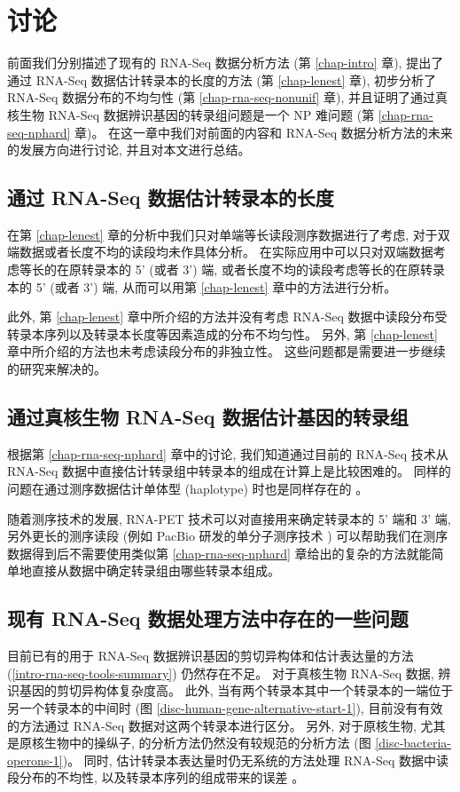 \chapter{讨论}
前面我们分别描述了现有的 RNA-Seq 数据分析方法 (第 \ref{chap-intro} 章), 
提出了通过 RNA-Seq 数据估计转录本的长度的方法 (第 \ref{chap-lenest} 章),  
初步分析了 RNA-Seq 数据分布的不均匀性 (第 \ref{chap-rna-seq-nonunif} 章),  
并且证明了通过真核生物 RNA-Seq 数据辨识基因的转录组问题是一个 NP 难问题 (第 \ref{chap-rna-seq-nphard} 章)。   
在这一章中我们对前面的内容和 RNA-Seq 数据分析方法的未来的发展方向进行讨论, 
并且对本文进行总结。 

\section{通过 RNA-Seq 数据估计转录本的长度}
在第 \ref{chap-lenest} 章的分析中我们只对单端等长读段测序数据进行了考虑, 
对于双端数据或者长度不均的读段均未作具体分析。 
在实际应用中可以只对双端数据考虑等长的在原转录本的 5' (或者 3') 端, 
或者长度不均的读段考虑等长的在原转录本的 5' (或者 3') 端, 
从而可以用第 \ref{chap-lenest} 章中的方法进行分析。 

此外, 第 \ref{chap-lenest} 章中所介绍的方法并没有考虑 RNA-Seq 
数据中读段分布受转录本序列以及转录本长度等因素造成的分布不均匀性。 
另外, 第 \ref{chap-lenest} 章中所介绍的方法也未考虑读段分布的非独立性。 
这些问题都是需要进一步继续的研究来解决的。 

\section{通过真核生物 RNA-Seq 数据估计基因的转录组}
根据第 \ref{chap-rna-seq-nphard} 章中的讨论, 
我们知道通过目前的 RNA-Seq 技术从 RNA-Seq 数据中直接估计转录组中转录本的组成在计算上是比较困难的。 
同样的问题在通过测序数据估计单体型 (haplotype) 
\cite{Li_Kim_Waterman_2004, Xing_Jordan_Sharan_2007} 时也是同样存在的 \cite{1668028}。 

随着测序技术的发展, 
RNA-PET \cite{Fullwood01042009} 技术可以对直接用来确定转录本的 5' 端和 3' 端, 
另外更长的测序读段 (例如 PacBio 研发的单分子测序技术 \cite{hybrid.rna.seq.2012})
可以帮助我们在测序数据得到后不需要使用类似第 \ref{chap-rna-seq-nphard} 
章给出的复杂的方法就能简单地直接从数据中确定转录组由哪些转录本组成。 

\section{现有 RNA-Seq 数据处理方法中存在的一些问题}
目前已有的用于 RNA-Seq 数据辨识基因的剪切异构体和估计表达量的方法 
(\ref{intro-rna-seq-tools-summary}) 仍然存在不足。 
对于真核生物 RNA-Seq 数据, 辨识基因的剪切异构体复杂度高。
此外, 当有两个转录本其中一个转录本的一端位于另一个转录本的中间时 
(图 \ref{disc-human-gene-alternative-start-1}), 
目前没有有效的方法通过 RNA-Seq 数据对这两个转录本进行区分。
另外, 对于原核生物, 尤其是原核生物中的操纵子, 的分析方法仍然没有较规范的分析方法 
\cite{mcclure2013computational} (图 \ref{disc-bacteria-operons-1})。
同时, 估计转录本表达量时仍无系统的方法处理 RNA-Seq 数据中读段分布的不均性, 
以及转录本序列的组成带来的误差 \cite{oshlack2009transcript, jones2012new}。


